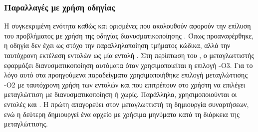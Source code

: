 %
%


\subsubsection{Παραλλαγές με χρήση οδηγίας \emph{}}
Η συγκεκριμένη ενότητα καθώς και ορισμένες που ακολουθούν αφορούν την επίλυση του προβλήματος  με χρήση της οδηγίας διανυσματικοποίησης \textbf{}. Όπως προαναφέρθηκε, η οδηγία δεν έχει ως στόχο την παραλληλοποίηση τμήματος κώδικα, αλλά την ταυτόχρονη εκτέλεση εντολών ως μία εντολή . Στη περίπτωση του , ο μεταγλωττιστής εφαρμόζει διανυσματικοποίηση αυτόματα όταν χρησιμοποιείται η επιλογή -Ο3. Για το λόγο αυτό στα προηγούμενα παραδείγματα χρησιμοποιήθηκε επιλογή μεταγλώττισης -Ο2 με ταυτόχρονη χρήση των εντολών  και 
 που επιτρέπουν στο χρήστη να επιλέγει μεταγλώττιση με διανυσματικοποίηση ή χωρίς. Παράλληλα, χρησιμοποιούνται οι εντολές  και . Η πρώτη απαγορεύει στον μεταγλωττιστή τη δημιουργία  συναρτήσεων, ενώ η δεύτερη δημιουργεί ένα αρχείο με χρήσιμα μηνύματα κατά τη διάρκεια της μεταγλώττισης.

